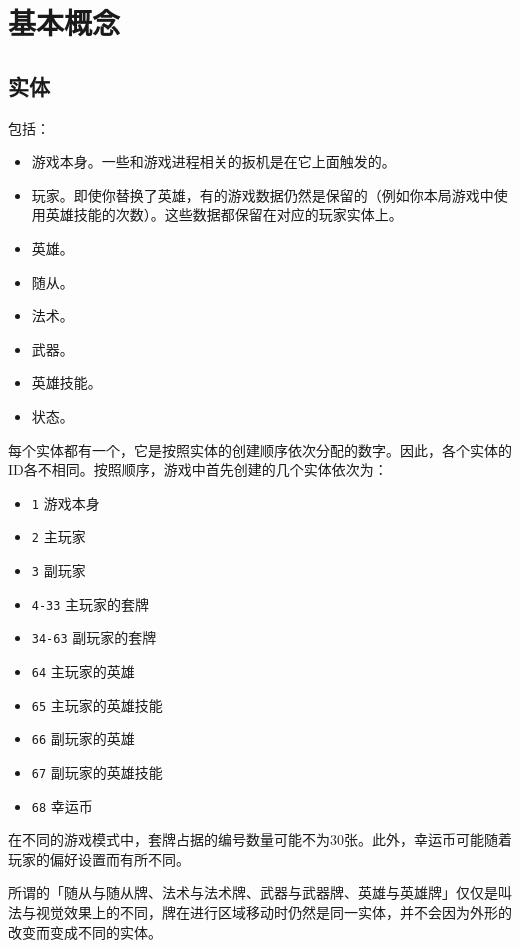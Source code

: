 \chapter{基本概念}
\label{basic-concept}

\section{实体}
\label{entity}

包括：
\begin{itemize}
    \item 游戏本身。一些和游戏进程相关的扳机是在它上面触发的。
    \item 玩家。即使你替换了英雄，有的游戏数据仍然是保留的（例如你本局游戏中使用英雄技能的次数）。这些数据都保留在对应的玩家实体上。
    \item 英雄。
    \item 随从。
    \item 法术。
    \item 武器。
    \item 英雄技能。
    \item 状态。
\end{itemize}

每个实体都有一个，它是按照实体的创建顺序依次分配的数字。因此，各个实体的ID各不相同。按照顺序，游戏中首先创建的几个实体依次为：
\begin{itemize}
    \item \texttt{1} 游戏本身
    \item \texttt{2} 主玩家
    \item \texttt{3} 副玩家
    \item \texttt{4-33} 主玩家的套牌
    \item \texttt{34-63} 副玩家的套牌
    \item \texttt{64} 主玩家的英雄
    \item \texttt{65} 主玩家的英雄技能
    \item \texttt{66} 副玩家的英雄
    \item \texttt{67} 副玩家的英雄技能
    \item \texttt{68} 幸运币
\end{itemize}
在不同的游戏模式中，套牌占据的编号数量可能不为30张。此外，幸运币可能随着玩家的偏好设置而有所不同。

\notice 所谓的「随从与随从牌、法术与法术牌、武器与武器牌、英雄与英雄牌」仅仅是叫法与视觉效果上的不同，牌在进行区域移动时仍然是同一实体，并不会因为外形的改变而变成不同的实体。


